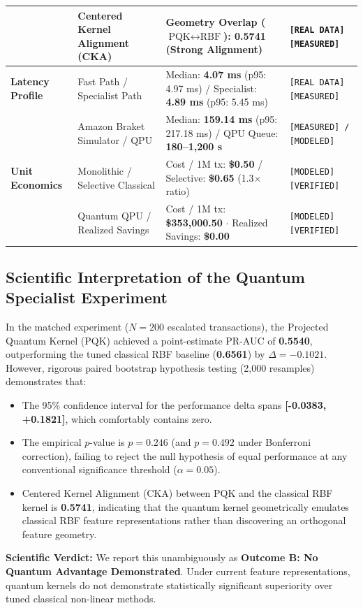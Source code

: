 \documentclass[10pt,a4paper]{article}
\begin{document}
\begin{center}
\begin{tabularx}{\linewidth}{@{}p{2.8cm}Xp{5.0cm}p{3.2cm}@{}}
& Centered Kernel Alignment (CKA) & Geometry Overlap ($\text{PQK} \leftrightarrow \text{RBF}$): \textbf{0.5741} (Strong Alignment) & \texttt{[REAL DATA][MEASURED]} \\
\midrule
\textbf{Latency Profile} & Fast Path / Specialist Path & Median: \textbf{4.07 ms} (p95: 4.97 ms) / Specialist: \textbf{4.89 ms} (p95: 5.45 ms) & \texttt{[REAL DATA][MEASURED]} \\
& Amazon Braket Simulator / QPU & Median: \textbf{159.14 ms} (p95: 217.18 ms) / QPU Queue: \textbf{180--1,200 s} & \texttt{[MEASURED] / [MODELED]} \\
\midrule
\textbf{Unit Economics} & Monolithic / Selective Classical & Cost / 1M tx: \textbf{\$0.50} / Selective: \textbf{\$0.65} (1.3$\times$ ratio) & \texttt{[MODELED][VERIFIED]} \\
& Quantum QPU / Realized Savings & Cost / 1M tx: \textbf{\$353,000.50} $\cdot$ Realized Savings: \textbf{\$0.00} & \texttt{[MODELED][VERIFIED]} \\
\bottomrule
\end{tabularx}
\end{center}
\vspace{-6pt}

\subsection{Scientific Interpretation of the Quantum Specialist Experiment}
In the matched experiment ($N=200$ escalated transactions), the Projected Quantum Kernel (PQK) achieved a point-estimate PR-AUC of \textbf{0.5540}, outperforming the tuned classical RBF baseline (\textbf{0.6561}) by $\Delta = -0.1021$. However, rigorous paired bootstrap hypothesis testing (2,000 resamples) demonstrates that:
\begin{itemize}[leftmargin=*,itemsep=0.2pt,topsep=0.5pt]
\item The 95\% confidence interval for the performance delta spans \textbf{[-0.0383, +0.1821]}, which comfortably contains zero.
\item The empirical $p$-value is \textbf{$p = 0.246$} (and $p = 0.492$ under Bonferroni correction), failing to reject the null hypothesis of equal performance at any conventional significance threshold ($\alpha = 0.05$).
\item Centered Kernel Alignment (CKA) between PQK and the classical RBF kernel is \textbf{0.5741}, indicating that the quantum kernel geometrically emulates classical RBF feature representations rather than discovering an orthogonal feature geometry.
\end{itemize}
\textbf{Scientific Verdict:} We report this unambiguously as \textbf{Outcome B: No Quantum Advantage Demonstrated}. Under current feature representations, quantum kernels do not demonstrate statistically significant superiority over tuned classical non-linear methods.
\end{document}
